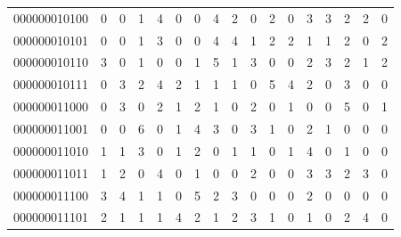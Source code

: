 \documentclass[10pt,a4paper]{article}
\begin{document}
\begin{longtable}{ |c|c|c|c|c|c|c|c|c|c|c|c|c|c|c|c|c| }
    000000010100              & 0                            & 0                                & 1                            & 4                              & 0   & 0   & 4   & 2   & 0   & 2   & 0   & 3   & 3   & 2   & 2   & 0   \\
    000000010101              & 0                            & 0                                & 1                            & 3                              & 0   & 0   & 4   & 4   & 1   & 2   & 2   & 1   & 1   & 2   & 0   & 2   \\
    000000010110              & 3                            & 0                                & 1                            & 0                              & 0   & 1   & 5   & 1   & 3   & 0   & 0   & 2   & 3   & 2   & 1   & 2   \\
    000000010111              & 0                            & 3                                & 2                            & 4                              & 2   & 1   & 1   & 1   & 0   & 5   & 4   & 2   & 0   & 3   & 0   & 0   \\
    000000011000              & 0                            & 3                                & 0                            & 2                              & 1   & 2   & 1   & 0   & 2   & 0   & 1   & 0   & 0   & 5   & 0   & 1   \\
    000000011001              & 0                            & 0                                & 6                            & 0                              & 1   & 4   & 3   & 0   & 3   & 1   & 0   & 2   & 1   & 0   & 0   & 0   \\
    000000011010              & 1                            & 1                                & 3                            & 0                              & 1   & 2   & 0   & 1   & 1   & 0   & 1   & 4   & 0   & 1   & 0   & 0   \\
    000000011011              & 1                            & 2                                & 0                            & 4                              & 0   & 1   & 0   & 0   & 2   & 0   & 0   & 3   & 3   & 2   & 3   & 0   \\
    000000011100              & 3                            & 4                                & 1                            & 1                              & 0   & 5   & 2   & 3   & 0   & 0   & 0   & 2   & 0   & 0   & 0   & 0   \\
    000000011101              & 2                            & 1                                & 1                            & 1                              & 4   & 2   & 1   & 2   & 3   & 1   & 0   & 1   & 0   & 2   & 4   & 0   \\

\end{longtable}
\end{document}
